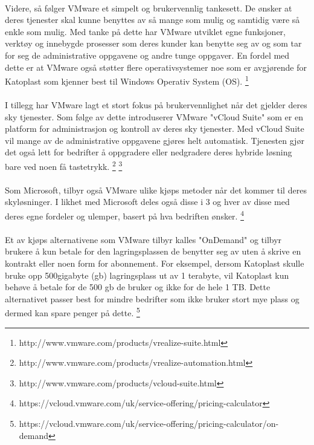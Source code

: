 \paragraph{} Videre, så følger VMware et simpelt og brukervennlig tankesett. De ønsker at deres tjenester skal kunne benyttes av så mange som mulig og samtidig være så enkle som mulig. Med tanke på dette har VMware utviklet egne funksjoner, verktøy og innebygde prosesser som deres kunder kan benytte seg av og som tar for seg de administrative oppgavene og andre tunge oppgaver. En fordel med dette er at VMware også støtter flere operativsystemer noe som er avgjørende for Katoplast som kjenner best til Windows Operativ System (OS). 
\footnote{http://www.vmware.com/products/vrealize-suite.html}

\paragraph{} I tillegg har VMware lagt et stort fokus på brukervennlighet når det gjelder deres sky tjenester. Som følge av dette introduserer VMware "vCloud Suite" som er en platform for administrasjon og kontroll av deres sky tjenester. Med vCloud Suite vil mange av de administrative oppgavene gjøres helt automatisk. Tjenesten gjør det også lett for bedrifter å oppgradere eller nedgradere deres hybride løsning bare ved noen få tastetrykk.
\footnote{http://www.vmware.com/products/vrealize-automation.html}
\footnote{http://www.vmware.com/products/vcloud-suite.html}

\paragraph{} Som Microsoft, tilbyr også VMware ulike kjøps metoder når det kommer til deres skyløsninger. I likhet med Microsoft deles også disse i 3 og hver av disse med deres egne fordeler og ulemper, basert på hva bedriften ønsker.
\footnote{https://vcloud.vmware.com/uk/service-offering/pricing-calculator}

\paragraph{} Et av kjøps alternativene som VMware tilbyr kalles "OnDemand" og tilbyr brukere å kun betale for den lagringsplassen de benytter seg av uten å skrive en kontrakt eller noen form for abonnement. For eksempel, dersom Katoplast skulle bruke opp 500gigabyte (gb) lagringsplass ut av 1 terabyte, vil Katoplast kun behøve å betale for de 500 gb de bruker og ikke for de hele 1 TB. Dette alternativet passer best for mindre bedrifter som ikke bruker stort mye plass og dermed kan spare penger på dette.
\footnote{https://vcloud.vmware.com/uk/service-offering/pricing-calculator/on-demand}

